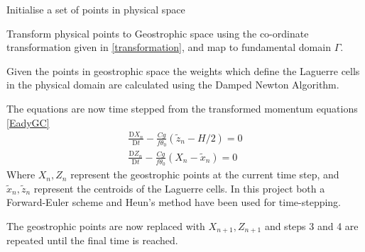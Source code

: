 \begin{description}
	\setlength{\parskip}{0pt}
	\setlength{\itemsep}{0pt}
	\item[Step 1] Initialise a set of points in physical space
	\item[Step 2] Transform physical points to Geostrophic space using the co-ordinate transformation given in \ref{transformation}, and map to fundamental domain $\Gamma$.
	\item[Step 3] Given the points in geostrophic space the weights which define the Laguerre cells in the physical domain are calculated using the Damped Newton Algorithm.
	\item[Step 4] The equations are now time stepped from the transformed momentum equations \ref{EadyGC} 
	\begin{equation*}
		\begin{aligned}
			\frac{\mathrm{D}X_{n}}{\mathrm{D}t} -\frac{Cg}{f\theta _0}\left(\tilde{z}_n-H/2\right) = 0 \\
			\frac{\mathrm{D}Z_{n}}{\mathrm{D}t} - \frac{Cg}{f\theta_0}\left(X_n - \tilde{x}_n\right) = 0
		\end{aligned}
	\end{equation*}
	Where $X_n, Z_n$ represent the geostrophic points at the current time step, and $\tilde{x}_n,\tilde{z}_n$ represent the centroids of the Laguerre cells. In this project both a Forward-Euler scheme and Heun's method have been used for time-stepping.
	\item[Step 5] The geostrophic points are now replaced with $X_{n+1}, Z_{n+1}$ and steps 3 and 4 are repeated until the final time is reached.
\end{description}
